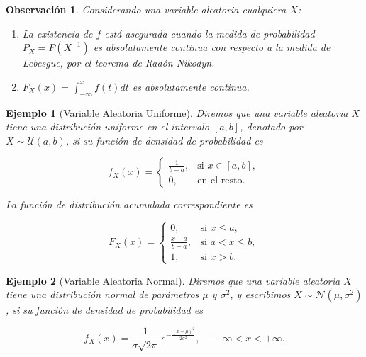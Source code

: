 \documentclass{report}
\newtheorem{dfn}{Definición}[section]
\newtheorem{obs}{Observación}[section]
\newtheorem{ej}{Ejemplo}[section]
\begin{document}
% 
%     


    
\begin{obs}
    Considerando una variable aleatoria cualquiera $X$:
    \begin{enumerate}
        \item La existencia de $f$ está asegurada cuando la medida de probabilidad $P_X=P(X^{-1})$ es absolutamente continua con respecto a la medida de Lebesgue,
        por el teorema de Radón-Nikodyn.
        \item $F_X(x) = \int_{-\infty}^x f(t)dt$ es absolutamente continua.
    \end{enumerate}
\end{obs}

\begin{ej}[Variable Aleatoria Uniforme]
Diremos que una variable aleatoria \( X \) tiene una \emph{distribución uniforme en el intervalo} \([a,b]\), denotado por \( X \sim \mathcal{U}(a,b) \), 
si su función de densidad de probabilidad es

\[
f_X(x) = \begin{cases}
\frac{1}{b - a}, & \text{si } x \in [a,b], \\
0, & \text{en el resto.}
\end{cases}
\]

La función de distribución acumulada correspondiente es

\[
F_X(x) = \begin{cases}
0, & \text{si } x \le a, \\
\frac{x - a}{b - a}, & \text{si } a < x \le b, \\
1, & \text{si } x > b.
\end{cases}
\]
\end{ej}

\begin{ej}[Variable Aleatoria Normal]\label{def distribucion normal}
Diremos que una variable aleatoria \( X \) tiene una \textit{distribución normal de parámetros} \( \mu \) y \( \sigma^2 \), y escribimos 
\( X \sim \mathcal{N}(\mu, \sigma^2) \), si su función de densidad de probabilidad es

\[
f_X(x) = \frac{1}{\sigma \sqrt{2\pi}} \, e^{ -\frac{(x - \mu)^2}{2\sigma^2} }, \quad -\infty < x < +\infty.
\]
\end{ej}
\end{document}
